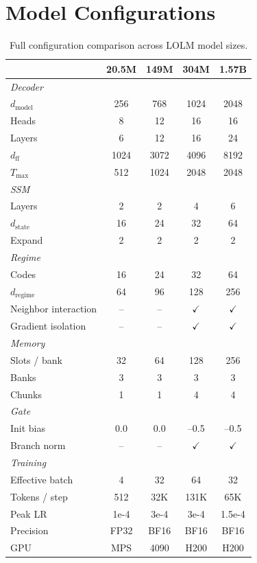 \documentclass{article}
\begin{document}
\appendix

\section{Model Configurations}
\label{app:configs}

\begin{table}[h]
\centering
\caption{Full configuration comparison across LOLM model sizes.}
\vspace{0.5em}
\small
\begin{tabular}{lcccc}
\toprule
& \textbf{20.5M} & \textbf{149M} & \textbf{304M} & \textbf{1.57B} \\
\midrule
\multicolumn{5}{l}{\emph{Decoder}} \\
\quad $d_\text{model}$ & 256 & 768 & 1024 & 2048 \\
\quad Heads & 8 & 12 & 16 & 16 \\
\quad Layers & 6 & 12 & 16 & 24 \\
\quad $d_\text{ff}$ & 1024 & 3072 & 4096 & 8192 \\
\quad $T_\text{max}$ & 512 & 1024 & 2048 & 2048 \\
\midrule
\multicolumn{5}{l}{\emph{SSM}} \\
\quad Layers & 2 & 2 & 4 & 6 \\
\quad $d_\text{state}$ & 16 & 24 & 32 & 64 \\
\quad Expand & 2 & 2 & 2 & 2 \\
\midrule
\multicolumn{5}{l}{\emph{Regime}} \\
\quad Codes & 16 & 24 & 32 & 64 \\
\quad $d_\text{regime}$ & 64 & 96 & 128 & 256 \\
\quad Neighbor interaction & -- & -- & $\checkmark$ & $\checkmark$ \\
\quad Gradient isolation & -- & -- & $\checkmark$ & $\checkmark$ \\
\midrule
\multicolumn{5}{l}{\emph{Memory}} \\
\quad Slots / bank & 32 & 64 & 128 & 256 \\
\quad Banks & 3 & 3 & 3 & 3 \\
\quad Chunks & 1 & 1 & 4 & 4 \\
\midrule
\multicolumn{5}{l}{\emph{Gate}} \\
\quad Init bias & 0.0 & 0.0 & --0.5 & --0.5 \\
\quad Branch norm & -- & -- & $\checkmark$ & $\checkmark$ \\
\midrule
\multicolumn{5}{l}{\emph{Training}} \\
\quad Effective batch & 4 & 32 & 64 & 32 \\
\quad Tokens / step & 512 & 32K & 131K & 65K \\
\quad Peak LR & 1e-4 & 3e-4 & 3e-4 & 1.5e-4 \\
\quad Precision & FP32 & BF16 & BF16 & BF16 \\
\quad GPU & MPS & 4090 & H200 & H200 \\
\bottomrule
\end{tabular}
\end{table}
\end{document}
